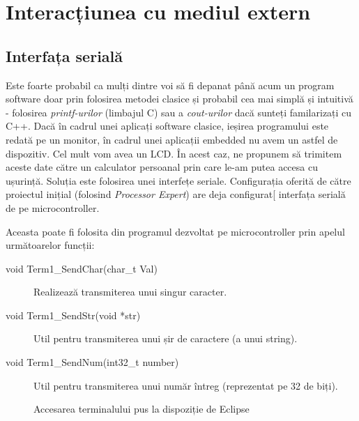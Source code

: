 \chapter{Interacțiunea cu mediul extern}

\section{Interfața serială}

Este foarte probabil ca mulți dintre voi să fi depanat până acum un program software doar prin folosirea metodei clasice și probabil cea mai simplă și intuitivă - folosirea \textit{printf-urilor} (limbajul C) sau a \textit{cout-urilor} dacă sunteți familarizați cu C++. Dacă în cadrul unei aplicați software clasice, ieșirea programului este redată pe un monitor, în cadrul unei aplicații embedded nu avem un astfel de dispozitiv. Cel mult vom avea un LCD. În acest caz, ne propunem să trimitem aceste date către un calculator persoanal prin care le-am putea accesa cu ușurință. Soluția este folosirea unei interfețe seriale. Configurația oferită de către proiectul inițial (folosind \textit{Processor Expert}) are deja configurat[ interfața serială de pe microcontroller.

Aceasta poate fi folosita din programul dezvoltat pe microcontroller prin apelul următoarelor funcții:

\begin{description}
    \item[void Term1\_SendChar(char\_t Val)] Realizează transmiterea unui singur caracter.
    \item[void Term1\_SendStr(void *str)] Util pentru transmiterea unui șir de caractere (a unui string).
    \item[void Term1\_SendNum(int32\_t number)] Util pentru transmiterea unui număr întreg (reprezentat pe 32 de biți).
\end{description}

\begin{figure}[h!]
  \vspace{-10pt}
  \vspace{-5pt}
  \caption{\label{fig:CodeWarrior-EclipseTerminal} Accesarea terminalului pus la dispoziție de Eclipse}
  \vspace{-10pt}
\end{figure}

